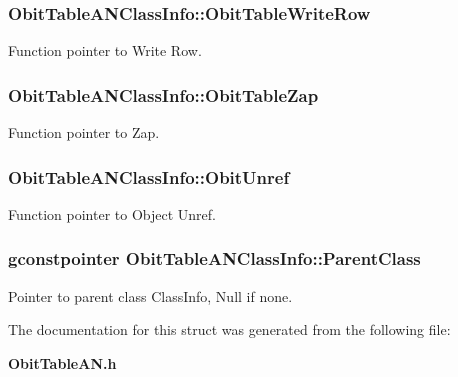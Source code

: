 \subsubsection{ {\bf Obit\-Table\-ANClass\-Info::Obit\-Table\-Write\-Row}}\label{structObitTableANClassInfo_o26}


Function pointer to Write Row. 

\subsubsection{ {\bf Obit\-Table\-ANClass\-Info::Obit\-Table\-Zap}}\label{structObitTableANClassInfo_o19}


Function pointer to Zap. 

\subsubsection{ {\bf Obit\-Table\-ANClass\-Info::Obit\-Unref}}\label{structObitTableANClassInfo_o11}


Function pointer to Object Unref. 

\subsubsection{\setlength{\rightskip}{0pt plus 5cm}gconstpointer {\bf Obit\-Table\-ANClass\-Info::Parent\-Class}}\label{structObitTableANClassInfo_o3}


Pointer to parent class Class\-Info, Null if none. 



The documentation for this struct was generated from the following file:\begin{CompactItemize}
\item 
{\bf Obit\-Table\-AN.h}\end{CompactItemize}
